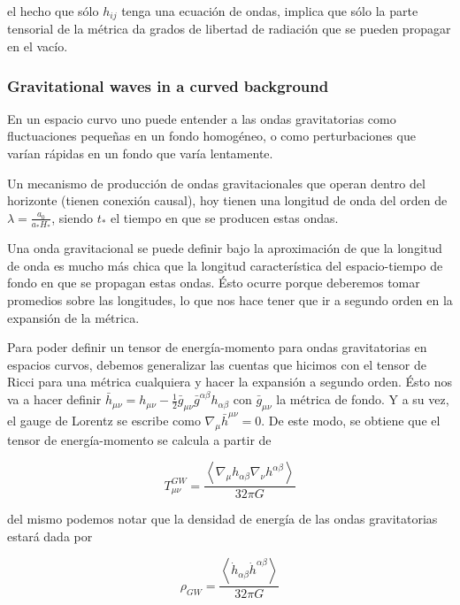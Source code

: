 \noindent
el hecho que sólo $h_{ij}$ tenga una ecuación de ondas, implica que sólo la parte tensorial de la métrica da grados de libertad de radiación que se pueden propagar en el vacío.

\subsubsection{Gravitational waves in a curved background}

En un espacio curvo uno puede entender a las ondas gravitatorias como fluctuaciones pequeñas en un fondo homogéneo, o como perturbaciones que varían rápidas en un fondo que varía lentamente.

Un mecanismo de producción de ondas gravitacionales que operan dentro del horizonte (tienen conexión causal), hoy tienen una longitud de onda del orden de $\displaystyle \lambda = \frac{a_0}{a_* H_*}$, siendo $t_*$ el tiempo en que se producen estas ondas.

Una onda gravitacional se puede definir bajo la aproximación de que la longitud de onda es mucho más chica que la longitud característica del espacio-tiempo de fondo en que se propagan estas ondas. Ésto ocurre porque deberemos tomar promedios sobre las longitudes, lo que nos hace tener que ir a segundo orden en la expansión de la métrica.

Para poder definir un tensor de energía-momento para ondas gravitatorias en espacios curvos, debemos generalizar las cuentas que hicimos con el tensor de Ricci para una métrica cualquiera y hacer la expansión a segundo orden. Ésto nos va a hacer definir $\displaystyle \bar{h}_{\mu \nu} = h_{\mu \nu} - \frac{1}{2} \bar{g}_{\mu \nu} \bar{g}^{\alpha \beta} h_{\alpha \beta}$ con $\bar{g}_{\mu \nu}$ la métrica de fondo. Y a su vez, el gauge de Lorentz se escribe como $\nabla_\mu \bar{h}^{\mu\nu} = 0$. De este modo, se obtiene que el tensor de energía-momento se calcula a partir de

\begin{equation}
    T^{GW}_{\mu \nu} = \frac{\left\langle \nabla_\mu h_{\alpha \beta} \nabla_\nu h^{\alpha \beta} \right\rangle}{32 \pi G}
\end{equation}

\noindent
del mismo podemos notar que la densidad de energía de las ondas gravitatorias estará dada por

\begin{equation}
    \rho_{GW} = \frac{\left\langle \dot{h}_{\alpha \beta} \dot{h}^{\alpha \beta} \right\rangle}{32 \pi G}
\end{equation}

